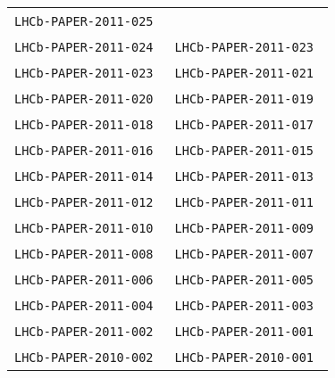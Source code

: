 \begin{center}
\begin{longtable}{ll}
\texttt{LHCb-PAPER-2011-025}~\cite{LHCb-PAPER-2011-025} \\
\texttt{LHCb-PAPER-2011-024}~\cite{LHCb-PAPER-2011-024} &
\texttt{LHCb-PAPER-2011-023}~\cite{LHCb-PAPER-2011-023} \\
\texttt{LHCb-PAPER-2011-023}~\cite{LHCb-PAPER-2011-022} &
\texttt{LHCb-PAPER-2011-021}~\cite{LHCb-PAPER-2011-021} \\
\texttt{LHCb-PAPER-2011-020}~\cite{LHCb-PAPER-2011-020} &
\texttt{LHCb-PAPER-2011-019}~\cite{LHCb-PAPER-2011-019} \\
\texttt{LHCb-PAPER-2011-018}~\cite{LHCb-PAPER-2011-018} &
\texttt{LHCb-PAPER-2011-017}~\cite{LHCb-PAPER-2011-017} \\
\texttt{LHCb-PAPER-2011-016}~\cite{LHCb-PAPER-2011-016} &
\texttt{LHCb-PAPER-2011-015}~\cite{LHCb-PAPER-2011-015} \\
\texttt{LHCb-PAPER-2011-014}~\cite{LHCb-PAPER-2011-014} &
\texttt{LHCb-PAPER-2011-013}~\cite{LHCb-PAPER-2011-013} \\
\texttt{LHCb-PAPER-2011-012}~\cite{LHCb-PAPER-2011-012} &
\texttt{LHCb-PAPER-2011-011}~\cite{LHCb-PAPER-2011-011} \\
\texttt{LHCb-PAPER-2011-010}~\cite{LHCb-PAPER-2011-010} &
\texttt{LHCb-PAPER-2011-009}~\cite{LHCb-PAPER-2011-009} \\
\texttt{LHCb-PAPER-2011-008}~\cite{LHCb-PAPER-2011-008} &
\texttt{LHCb-PAPER-2011-007}~\cite{LHCb-PAPER-2011-007} \\
\texttt{LHCb-PAPER-2011-006}~\cite{LHCb-PAPER-2011-006} &
\texttt{LHCb-PAPER-2011-005}~\cite{LHCb-PAPER-2011-005} \\
\texttt{LHCb-PAPER-2011-004}~\cite{LHCb-PAPER-2011-004} &
\texttt{LHCb-PAPER-2011-003}~\cite{LHCb-PAPER-2011-003} \\
\texttt{LHCb-PAPER-2011-002}~\cite{LHCb-PAPER-2011-002} &
\texttt{LHCb-PAPER-2011-001}~\cite{LHCb-PAPER-2011-001} \\
\hline
\texttt{LHCb-PAPER-2010-002}~\cite{LHCb-PAPER-2010-002} &
\texttt{LHCb-PAPER-2010-001}~\cite{LHCb-PAPER-2010-001} \\
\hline
\end{longtable}
\end{center}

